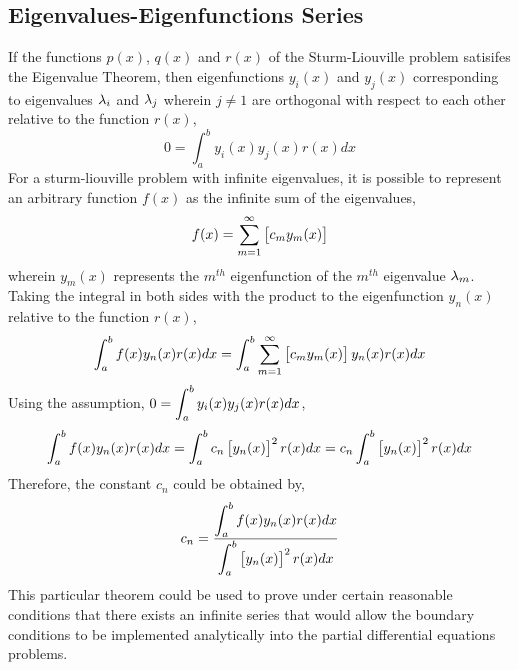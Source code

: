 \documentclass[class=report, 12pt, crop=false]{standalone}
\begin{document}
\begin{center}
\section{Eigenvalues-Eigenfunctions Series}
\begin{comment}
\end{comment}
If the functions $p(x)$, $q(x)$ and $r(x)$ of the Sturm-Liouville problem satisifes the Eigenvalue Theorem, then eigenfunctions $y_i(x)$ and $y_j(x)$ corresponding to eigenvalues $\lambda_i$ and $\lambda_j$ wherein $j\neq1$ are orthogonal with respect to each other relative to the function $r(x)$,
$$0 = \int^{b}_{a}y_i(x)y_j(x)r(x)dx$$
For a sturm-liouville problem with infinite eigenvalues, it is possible to represent an arbitrary function $f(x)$ as the infinite sum of the eigenvalues,
$$f(x) = \sum^{\infty}_{m=1}\left[c_my_m(x)\right]$$
wherein $y_m(x)$ represents the $m^{th}$ eigenfunction of the $m^{th}$ eigenvalue $\lambda_m$. Taking the integral in both sides with the product to the eigenfunction $y_n(x)$ relative to the function $r(x)$,
$$\int^{b}_{a}f(x)y_n(x)r(x)dx = \int^{b}_{a}\sum^{\infty}_{m=1}\left[c_my_m(x)\right]y_n(x)r(x)dx$$
Using the assumption, $\displaystyle{0 = \int^{b}_{a}y_i(x)y_j(x)r(x)dx}$,
$$\int^{b}_{a}f(x)y_n(x)r(x)dx = \int^{b}_{a}c_n\left[y_n(x)\right]^2r(x)dx = c_n\int^{b}_{a}\left[y_n(x)\right]^2r(x)dx$$
Therefore, the constant $c_n$ could be obtained by,
$$c_n = \frac{\displaystyle{\int^{b}_{a}f(x)y_n(x)r(x)dx}}{\displaystyle{\int^{b}_{a}\left[y_n(x)\right]^2r(x)dx}}$$
This particular theorem could be used to prove under certain reasonable conditions that there exists an infinite series that would allow the boundary conditions to be implemented analytically into the partial differential equations problems.
\end{center}
\end{document}
